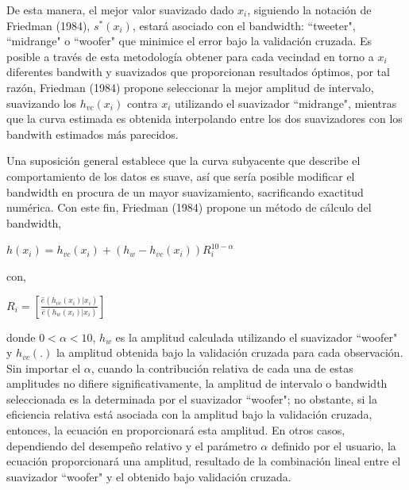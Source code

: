 \hspace*{0.4 cm} De esta manera, el mejor valor suavizado dado $x_{i}$, siguiendo la notaci\'on de Friedman (1984), $s^{*}(x_{i})$, estar\'a asociado con el bandwidth: ``tweeter", ``midrange" o ``woofer" que minimice el error bajo la validaci\'on cruzada. Es posible a trav\'es de esta metodolog\'ia obtener para cada vecindad en torno a $x_{i}$ diferentes bandwith y suavizados que proporcionan resultados \'optimos, por tal raz\'on, Friedman (1984) propone seleccionar la mejor amplitud de intervalo, suavizando los $h_{vc} (x_{i})$ contra $x_{i}$ utilizando el suavizador ``midrange", mientras que la curva estimada es obtenida interpolando entre los dos suavizadores con los bandwith estimados m\'as parecidos.


\hspace*{0.4 cm} Una suposici\'on general establece que la curva subyacente que describe el comportamiento de los datos es suave, as\'i que ser\'ia posible modificar el bandwidth en procura de un mayor suavizamiento, sacrificando exactitud num\'erica. Con este fin, Friedman (1984) propone un m\'etodo de c\'alculo del bandwidth,

\vspace*{0.2 cm}

\begin{center}
$\displaystyle{h(x_{i}) = h_{vc}(x_{i}) + (h_{w} - h_{vc}(x_{i}))R_{i}^{10-\alpha}}$
\end{center}

\vspace*{0.2 cm}

\noindent con, 

\vspace*{0.2 cm}

\begin{center}
$\displaystyle{R_{i} = \left[\frac{\hat{e}(h_{vc}(x_{i})|x_{i})}{\hat{e}(h_{w}(x_{i})|x_{i})} \right] }$
\end{center}

\vspace*{0.2 cm}

\noindent donde $0 < \alpha < 10$, $h_{w}$ es la amplitud calculada utilizando 
el suavizador ``woofer"\hspace*{0.01 cm} y $h_{vc}(.)$ la amplitud obtenida bajo la validaci\'on cruzada para cada observaci\'on. Sin importar el $\alpha$, cuando la contribuci\'on relativa de cada una de estas amplitudes no difiere significativamente, la amplitud de intervalo o bandwidth seleccionada es la determinada por el suavizador ``woofer"\hspace*{0.01 cm}; no obstante, si la eficiencia relativa est\'a asociada con la amplitud bajo la validaci\'on cruzada, entonces, la ecuaci\'on en proporcionar\'a esta amplitud. En otros casos, dependiendo del desempe\~no relativo y el par\'ametro $\alpha$ definido por el usuario, la ecuaci\'on proporcionar\'a una amplitud, resultado de la combinaci\'on lineal entre el suavizador ``woofer" \hspace*{0.01 cm} y el obtenido bajo validaci\'on cruzada.

